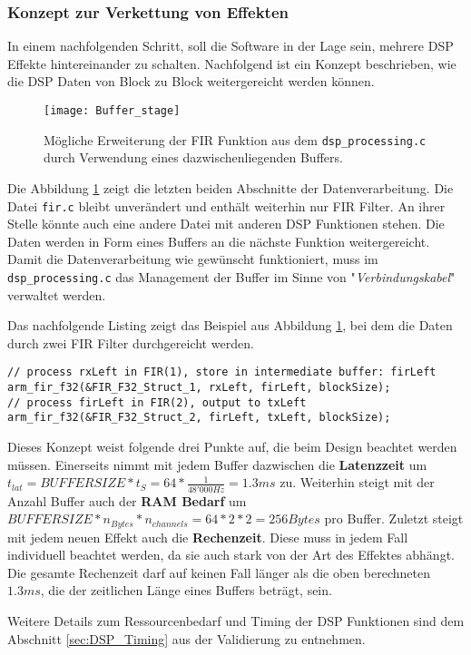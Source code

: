 \subsubsection{Konzept zur Verkettung von Effekten}
\label{sec:DSPChaining}

In einem nachfolgenden Schritt, soll die Software in der Lage sein, mehrere DSP Effekte hintereinander zu schalten. Nachfolgend ist ein Konzept beschrieben, wie die DSP Daten von Block zu Block weitergereicht werden können.

\begin{figure}[H]
	\centering
	\texttt{[image: Buffer\_stage]}
	\caption{Mögliche Erweiterung der FIR Funktion aus dem \texttt{dsp\_processing.c} durch Verwendung eines dazwischenliegenden Buffers.}
	\label{pic:Buffer_stage}
\end{figure}

Die Abbildung \ref{pic:Buffer_stage} zeigt die letzten beiden Abschnitte der Datenverarbeitung. Die Datei \texttt{fir.c} bleibt unverändert und enthält weiterhin nur FIR Filter. An ihrer Stelle könnte auch eine andere Datei mit anderen DSP Funktionen stehen.
Die Daten werden in Form eines Buffers an die nächste Funktion weitergereicht.
Damit die Datenverarbeitung wie gewünscht funktioniert, muss im \texttt{dsp\_processing.c} das Management der Buffer im Sinne von "\textit{Verbindungskabel}" verwaltet werden.

Das nachfolgende Listing zeigt das Beispiel aus Abbildung \ref{pic:Buffer_stage}, bei dem die Daten durch zwei FIR Filter durchgereicht werden.

\begin{lstlisting}[style=Cuvision, caption={Daten mittels Buffer und zwei FIR Filter bearbeiten}]
// process rxLeft in FIR(1), store in intermediate buffer: firLeft
arm_fir_f32(&FIR_F32_Struct_1, rxLeft, firLeft, blockSize);
// process firLeft in FIR(2), output to txLeft
arm_fir_f32(&FIR_F32_Struct_2, firLeft, txLeft, blockSize);

\end{lstlisting}

Dieses Konzept weist folgende drei Punkte auf, die beim Design beachtet werden müssen.
Einerseits nimmt mit jedem Buffer dazwischen die \textbf{Latenzzeit} um $t_{lat}=BUFFERSIZE*t_S=64*\frac{1}{48'000\si{Hz}}=1.3\si{ms}$ zu.
Weiterhin steigt mit der Anzahl Buffer auch der \textbf{RAM Bedarf} um $BUFFERSIZE*n_{Bytes}*n_{channels}=64*2*2=256\si{Bytes}$ pro Buffer.
Zuletzt steigt mit jedem neuen Effekt auch die \textbf{Rechenzeit}. Diese muss in jedem Fall individuell beachtet werden, da sie auch stark von der Art des Effektes abhängt.
Die gesamte Rechenzeit darf auf keinen Fall länger als die oben berechneten $1.3\si{ms}$, die der zeitlichen Länge eines Buffers beträgt, sein.

Weitere Details zum Ressourcenbedarf und Timing der DSP Funktionen sind dem Abschnitt \ref{sec:DSP_Timing} aus der Validierung zu entnehmen.

